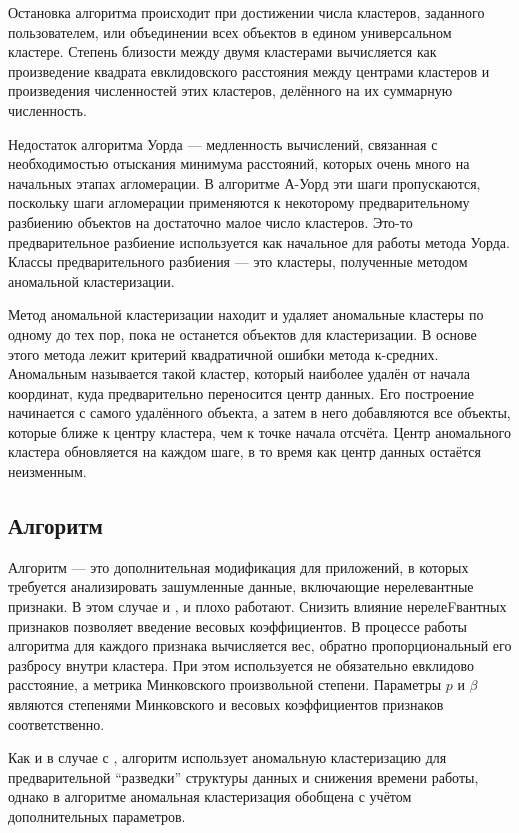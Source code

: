 \documentclass[12pt,tikz]{instruction}
\begin{document}
Остановка алгоритма происходит при достижении числа кластеров, заданного пользователем, или объединении всех объектов в едином универсальном кластере. Степень близости между двумя кластерами вычисляется как произведение квадрата евклидовского расстояния между центрами кластеров и произведения численностей этих кластеров, делённого на их суммарную численность. 

Недостаток алгоритма Уорда --- медленность вычислений, связанная с необходимостью отыскания минимума расстояний, которых очень много на начальных этапах агломерации. В алгоритме А-Уорд эти шаги пропускаются, поскольку шаги агломерации применяются к некоторому предварительному разбиению объектов на достаточно малое число кластеров. Это-то предварительное разбиение используется как начальное для работы метода Уорда. Классы предварительного разбиения --- это кластеры, полученные методом аномальной кластеризации.

Метод аномальной кластеризации находит и удаляет аномальные кластеры по одному до тех пор, пока не останется объектов для кластеризации. В основе этого метода лежит критерий квадратичной ошибки метода к-средних. Аномальным называется такой кластер, который наиболее удалён от начала координат, куда предварительно переносится центр данных. Его построение начинается с самого удалённого объекта, а затем в него добавляются все объекты, которые ближе к центру кластера, чем к точке начала отсчёта. Центр аномального кластера обновляется на каждом шаге, в то время как центр данных остаётся неизменным.


\subsection{Алгоритм  \AWardpb}
Алгоритм \AWardpb --- это дополнительная модификация для приложений, в которых требуется анализировать зашумленные данные, включающие нерелевантные признаки. В этом случае и \Ward, и \AWard плохо работают. Снизить влияние нерелеFвантных признаков позволяет введение весовых коэффициентов. В процессе работы алгоритма \AWardpb для каждого признака вычисляется вес, обратно пропорциональный его разбросу  внутри кластера. При этом используется не обязательно евклидово расстояние, а метрика Минковского произвольной степени. Параметры $ p $ и  $ \beta $ являются степенями Минковского и 
весовых коэффициентов признаков соответственно.

Как и в случае с \AWard, алгоритм \AWardpb использует аномальную кластеризацию для предварительной ``разведки'' структуры данных и снижения времени работы, однако в алгоритме \AWardpb аномальная кластеризация обобщена с учётом дополнительных параметров.
\end{document}
